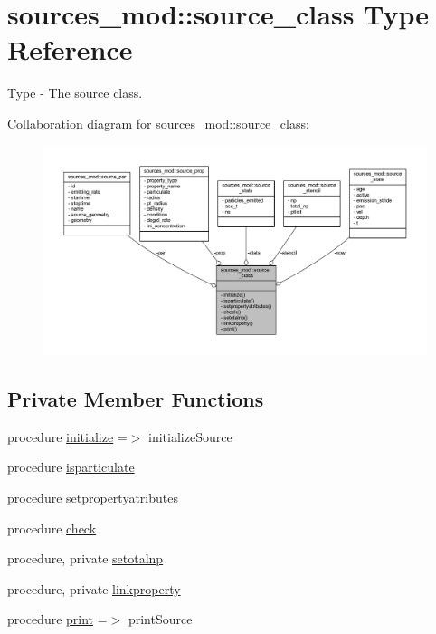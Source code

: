 \hypertarget{structsources__mod_1_1source__class}{}\section{sources\+\_\+mod\+:\+:source\+\_\+class Type Reference}
\label{structsources__mod_1_1source__class}


Type -\/ The source class.  




Collaboration diagram for sources\+\_\+mod\+:\+:source\+\_\+class\+:
\nopagebreak
\begin{figure}[H]
\begin{center}
\leavevmode
\includegraphics[width=350pt]{structsources__mod_1_1source__class__coll__graph}
\end{center}
\end{figure}
\subsection*{Private Member Functions}
\begin{DoxyCompactItemize}
\item 
procedure \mbox{\hyperlink{structsources__mod_1_1source__class_a996650639d039c09d2b77a36473e977e}{initialize}} =$>$ initialize\+Source
\item 
procedure \mbox{\hyperlink{structsources__mod_1_1source__class_aa0577157bf75a525f9e1bde905500ab7}{isparticulate}}
\item 
procedure \mbox{\hyperlink{structsources__mod_1_1source__class_a1cdbd1115f420bf0bda21067940bcb58}{setpropertyatributes}}
\item 
procedure \mbox{\hyperlink{structsources__mod_1_1source__class_acbed40c917e4dacc0cd9dd7931e27839}{check}}
\item 
procedure, private \mbox{\hyperlink{structsources__mod_1_1source__class_a6098dbb749bed525919e6370aed70ef9}{setotalnp}}
\item 
procedure, private \mbox{\hyperlink{structsources__mod_1_1source__class_a58282637980cd13f683be32cb57dc227}{linkproperty}}
\item 
procedure \mbox{\hyperlink{structsources__mod_1_1source__class_af632299e6c5e29a7f2008417aa68d529}{print}} =$>$ print\+Source
\end{DoxyCompactItemize}
